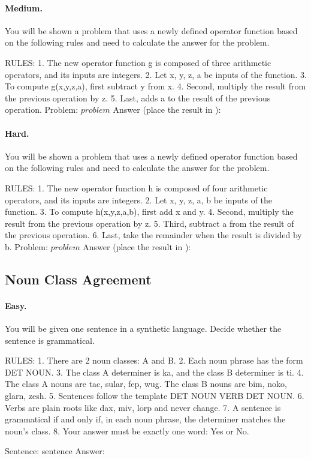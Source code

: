 \paragraph{Medium.}
\begin{promptbox}
You will be shown a problem that uses a newly defined operator function based on the following rules and need to calculate the answer for the problem.

RULES:
1. The new operator function g is composed of three arithmetic operators, and its inputs are integers.
2. Let x, y, z, a be inputs of the function.
3. To compute g(x,y,z,a), first subtract y from x.
4. Second, multiply the result from the previous operation by z.
5. Last, adds a to the result of the previous operation.
Problem: \({problem}\)
Answer (place the result in \boxed{}):\boxed{}
\end{promptbox}

\paragraph{Hard.}
\begin{promptbox}
You will be shown a problem that uses a newly defined operator function based on the following rules and need to calculate the answer for the problem.

RULES:
1. The new operator function h is composed of four arithmetic operators, and its inputs are integers.
2. Let x, y, z, a, b be inputs of the function.
3. To compute h(x,y,z,a,b), first add x and y.
4. Second, multiply the result from the previous operation by z.
5. Third, subtract a from the result of the previous operation.
6. Last, take the remainder when the result is divided by b.
Problem: \({problem}\)
Answer (place the result in \boxed{}):\boxed{}
\end{promptbox}

\subsection*{Noun Class Agreement}

\paragraph{Easy.}
\begin{promptbox}
You will be given one sentence in a synthetic language. Decide whether the sentence is grammatical.

RULES:
1. There are 2 noun classes: A and B.
2. Each noun phrase has the form DET NOUN.
3. The class A determiner is ka, and the class B determiner is ti.
4. The class A nouns are tac, sular, fep, wug. The class B nouns are bim, noko, glarn, zesh.
5. Sentences follow the template DET NOUN VERB DET NOUN.
6. Verbs are plain roots like dax, miv, lorp and never change.
7. A sentence is grammatical if and only if, in each noun phrase, the determiner matches the noun's class.
8. Your answer must be exactly one word: Yes or No.

Sentence: {sentence}
Answer:
\end{promptbox}

